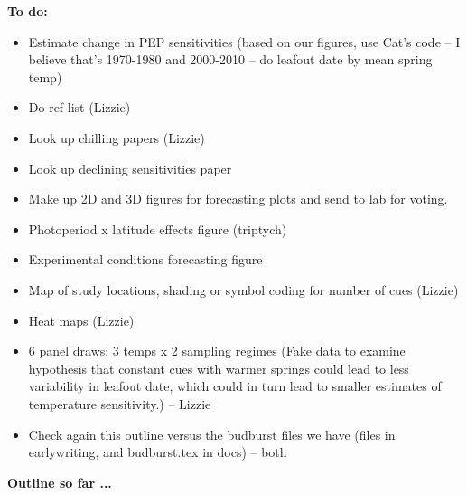 \documentclass[11pt,letter]{article}
\begin{document}
{\bf To do:}
\begin{itemize}
\item Estimate change in PEP sensitivities (based on our figures, use Cat's code -- I believe that's 1970-1980 and 2000-2010 -- do leafout date by mean spring temp)
\item Do ref list (Lizzie) 
\item Look up chilling papers (Lizzie)
\item Look up declining sensitivities paper 
\item Make up 2D and 3D figures for forecasting plots and send to lab for voting.
\item Photoperiod x latitude effects figure (triptych) 
\item Experimental conditions forecasting figure 
\item Map of study locations, shading or symbol coding for number of cues (Lizzie)
\item Heat maps (Lizzie)
\item 6 panel draws: 3 temps x 2 sampling regimes (Fake data to examine hypothesis that constant cues with warmer springs could lead to less variability in leafout date, which could in turn lead to smaller estimates of temperature sensitivity.) -- Lizzie
\item Check again this outline versus the budburst files we have (files in earlywriting, and budburst.tex in docs) -- both
\end{itemize}


{\bf Outline so far ...}
\end{document}
